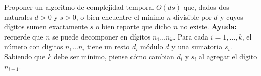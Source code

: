  \item Proponer un algoritmo de complejidad temporal $O(ds)$ que, dados dos naturales $d > 0$ y $s > 0$, o bien encuentre el mínimo $n$ divisible por $d$ y cuyos dígitos sumen exactamente $s$ o bien reporte que dicho $n$ no existe.  \textbf{Ayuda:} recuerde que $n$ se puede decomponer en dígitos $n_1 \ldots n_k$.  Para cada $i=1,\ldots,k$, el número con digitos $n_1 \ldots n_i$ tiene un resto $d_i$ módulo $d$ y una sumatoria $s_i$.  Sabiendo que $k$ debe ser mínimo, piense cómo cambian $d_i$ y $s_i$ al agregar el dígito $n_{i+1}$.
